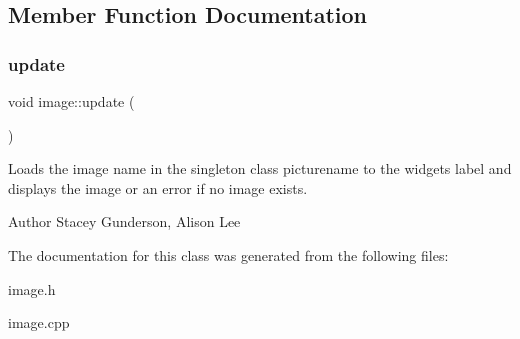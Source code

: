 \subsection{Member Function Documentation}
\mbox{\label{classimage_aa5f8271e58a9264d5f6a931e6d216f8d}} 
\subsubsection{\texorpdfstring{update}{update}}
{\footnotesize\ttfamily void image\+::update (\begin{DoxyParamCaption}{ }\end{DoxyParamCaption})\hspace{0.3cm}{\ttfamily [slot]}}



Loads the image name in the singleton class picturename to the widget\textquotesingle{}s label and displays the image or an error if no image exists. 

\begin{DoxyAuthor}{Author}
Stacey Gunderson, Alison Lee 
\end{DoxyAuthor}


The documentation for this class was generated from the following files\+:\begin{DoxyCompactItemize}
\item 
image.\+h\item 
image.\+cpp\end{DoxyCompactItemize}

